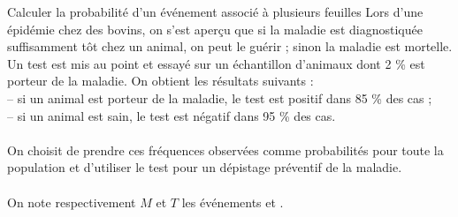 \begin{methodeTitre}{Calculer la probabilité d'un événement associé à plusieurs feuilles}
	Lors d'une épidémie chez des bovins, on s'est aperçu que si la maladie est diagnostiquée suffisamment tôt chez un animal, on peut le guérir ; sinon la maladie est mortelle.\\ 
	Un test est mis au point et essayé sur un échantillon d'animaux dont 2 \% est porteur de la maladie. On obtient les résultats suivants :\\
	– si un animal est porteur de la maladie, le test est positif dans 85 \% des cas ;\\
	– si un animal est sain, le test est négatif dans 95 \% des cas.\\
	\ \\
	On choisit de prendre ces fréquences observées comme probabilités pour toute la population et d'utiliser le test pour un dépistage préventif de la maladie.\\
	\ \\
	On note respectivement $M$ et $T$ les événements  et
	.
	

\end{methodeTitre}
